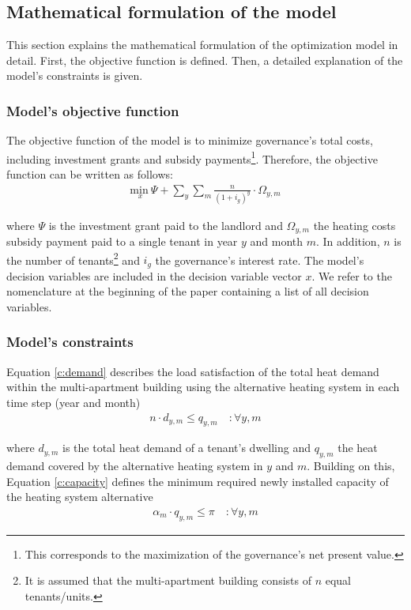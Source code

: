 \subsection{Mathematical formulation of the model}\label{met:formulas}
This section explains the mathematical formulation of the optimization model in detail. First, the objective function is defined. Then, a detailed explanation of the model's constraints is given. 

\subsubsection{Model's objective function}
The objective function of the model is to minimize governance's total costs, including investment grants and subsidy payments\footnote{This corresponds to the maximization of the governance's net present value.}. Therefore, the objective function can be written as follows: 
\begin{align}\label{objective}
\underset{x}{\mathrm{min~}} \Psi + \sum_{y} \sum_{m} \frac{n}{(1+i_g)^y} \cdot \Omega_{y,m}
\end{align}

where $\Psi$ is the investment grant paid to the landlord and $\Omega_{y,m}$ the heating costs subsidy payment paid to a single tenant in year $y$ and month $m$. In addition, $n$ is the number of tenants\footnote{It is assumed that the multi-apartment building consists of $n$ equal tenants/units.} and $i_g$ the governance's interest rate. The model's decision variables are included in the decision variable vector $x$. We refer to the nomenclature at the beginning of the paper containing a list of all decision variables.

\subsubsection{Model's constraints}
Equation \ref{c:demand} describes the load satisfaction of the total heat demand within the multi-apartment building using the alternative heating system in each time step (year and month) 
\begin{align}\label{c:demand}
n \cdot d_{y,m} \leq q_{y,m} \quad :\forall y,m
\end{align}

where $d_{y,m}$ is the total heat demand of a tenant's dwelling and $q_{y,m}$ the heat demand covered by the alternative heating system in $y$ and $m$. Building on this, Equation \ref{c:capacity} defines the minimum required newly installed capacity of the heating system alternative
\begin{align}\label{c:capacity}
\alpha_{m} \cdot q_{y,m} \leq \pi \quad :\forall y,m
\end{align}

